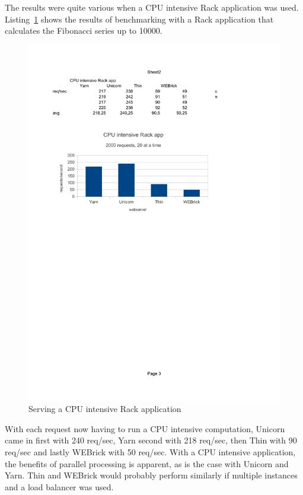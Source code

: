 The results were quite various when a CPU intensive Rack application was
used. Listing~\ref{cpubench} shows the results of benchmarking with a Rack
application that calculates the Fibonacci series up to 10000.

\begin{figure}[htb]
  \centering
  \includegraphics[width=1.0\textwidth]{benchmark/cpu.pdf}
  \caption{Serving a CPU intensive Rack application}
  \label{cpubench}
\end{figure}

With each request now having to run a CPU intensive computation, Unicorn came in
first with 240 req/sec, Yarn second with 218 req/sec, then Thin with 90
req/sec and lastly WEBrick with 50 req/sec. With a CPU intensive application,
the benefits of parallel processing is apparent, as is the case with
Unicorn and Yarn. Thin and WEBrick would probably perform similarly if
multiple instances and a load balancer was used.
